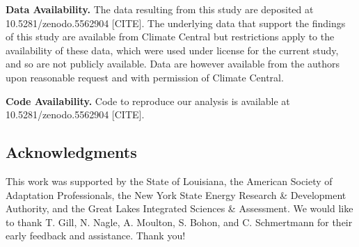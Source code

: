 \documentclass[9pt,twocolumn,twoside,]{pnas-new}
\begin{document}
\textbf{Data Availability.} The data resulting from this study are
deposited at 10.5281/zenodo.5562904 {[}CITE{]}. The underlying data that
support the findings of this study are available from Climate Central
but restrictions apply to the availability of these data, which were
used under license for the current study, and so are not publicly
available. Data are however available from the authors upon reasonable
request and with permission of Climate Central.

\textbf{Code Availability.} Code to reproduce our analysis is available
at 10.5281/zenodo.5562904 {[}CITE{]}.

\hypertarget{acknowledgements}{%
\subsection*{Acknowledgments}\label{acknowledgements}}

This work was supported by the State of Louisiana, the American Society
of Adaptation Professionals, the New York State Energy Research \&
Development Authority, and the Great Lakes Integrated Sciences \&
Assessment. We would like to thank T. Gill, N. Nagle, A. Moulton, S.
Bohon, and C. Schmertmann for their early feedback and assistance. Thank
you!

\showmatmethods
\showacknow
\pnasbreak
\end{document}
